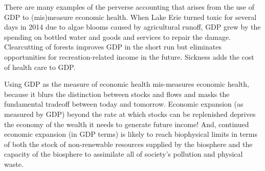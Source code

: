 There are many examples of the perverse accounting that arises from 
the use of GDP to (mis)measure economic health.
When Lake Erie turned toxic for several days in 2014 
due to algae blooms caused by agricultural runoff, 
GDP grew by the spending on bottled water and goods and services to repair the damage.
Clearcutting of forests improves GDP in the short run but eliminates 
opportunities for recreation-related income in the future.
Sickness adds the cost of health care to GDP.

Using GDP as the measure of economic health 
mis-measures economic health, 
because it blurs the distinction between stocks and flows
and masks the fundamental tradeoff
between today and tomorrow.
Economic expansion (as measured by GDP) 
beyond the rate at which stocks can be replenished 
deprives the economy 
of the wealth it needs to generate future income!
And, continued economic expansion (in GDP terms)
is likely to reach biophysical limits in terms of both 
the stock of non-renewable resources supplied by the biosphere
and the capacity of the biosphere to assimilate 
all of society's pollution and physical waste. 









